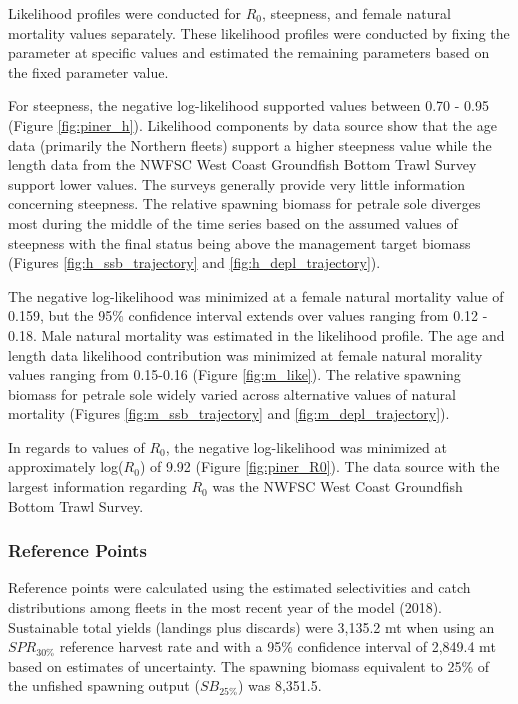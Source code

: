 \documentclass[12pt,]{article}
\begin{document}
Likelihood profiles were conducted for \(R_0\), steepness, and female
natural mortality values separately. These likelihood profiles were
conducted by fixing the parameter at specific values and estimated the
remaining parameters based on the fixed parameter value.

For steepness, the negative log-likelihood supported values between 0.70
- 0.95 (Figure \ref{fig:piner_h}). Likelihood components by data source
show that the age data (primarily the Northern fleets) support a higher
steepness value while the length data from the NWFSC West Coast
Groundfish Bottom Trawl Survey support lower values. The surveys
generally provide very little information concerning steepness. The
relative spawning biomass for petrale sole diverges most during the
middle of the time series based on the assumed values of steepness with
the final status being above the management target biomass (Figures
\ref{fig:h_ssb_trajectory} and \ref{fig:h_depl_trajectory}).

The negative log-likelihood was minimized at a female natural mortality
value of 0.159, but the 95\% confidence interval extends over values
ranging from 0.12 - 0.18. Male natural mortality was estimated in the
likelihood profile. The age and length data likelihood contribution was
minimized at female natural morality values ranging from 0.15-0.16
(Figure \ref{fig:m_like}). The relative spawning biomass for petrale
sole widely varied across alternative values of natural mortality
(Figures \ref{fig:m_ssb_trajectory} and \ref{fig:m_depl_trajectory}).

In regards to values of \(R_0\), the negative log-likelihood was
minimized at approximately log(\(R_0\)) of 9.92 (Figure
\ref{fig:piner_R0}). The data source with the largest information
regarding \(R_0\) was the NWFSC West Coast Groundfish Bottom Trawl
Survey.

\subsubsection{Reference Points}\label{reference-points-1}

Reference points were calculated using the estimated selectivities and
catch distributions among fleets in the most recent year of the model
(2018). Sustainable total yields (landings plus discards) were 3,135.2
mt when using an \(SPR_{30\%}\) reference harvest rate and with a 95\%
confidence interval of 2,849.4 mt based on estimates of uncertainty. The
spawning biomass equivalent to 25\% of the unfished spawning output
(\(SB_{25\%}\)) was 8,351.5.
\end{document}
